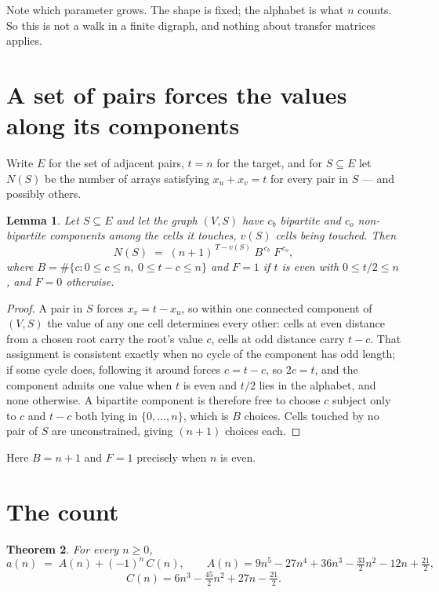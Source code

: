 \documentclass[11pt,a4paper]{article}
\theoremstyle{plain}
\newtheorem{theorem}{Theorem}
\newtheorem{lemma}[theorem]{Lemma}
\theoremstyle{definition}
\begin{document}
Note which parameter grows. The shape is fixed; the alphabet is what $n$ counts. So this is not
a walk in a finite digraph, and nothing about transfer matrices applies.

\section{A set of pairs forces the values along its components}

Write $E$ for the set of adjacent pairs, $t=n$ for the target, and for $S\subseteq E$ let
$N(S)$ be the number of arrays satisfying $x_u+x_v=t$ for every pair in $S$ --- and possibly
others.

\begin{lemma}\label{lem:comp}
Let $S\subseteq E$ and let the graph $(V,S)$ have $c_b$ bipartite and $c_o$ non-bipartite
components among the cells it touches, $v(S)$ cells being touched. Then
\[
N(S)\;=\;(n+1)^{\,T-v(S)}\;B^{\,c_b}\;F^{\,c_o},
\]
where $B=\#\{c: 0\le c\le n,\ 0\le t-c\le n\}$ and $F=1$ if $t$ is even with $0\le t/2\le n$,
and $F=0$ otherwise.
\end{lemma}

\begin{proof}
A pair in $S$ forces $x_v=t-x_u$, so within one connected component of $(V,S)$ the value of any
one cell determines every other: cells at even distance from a chosen root carry the root's
value $c$, cells at odd distance carry $t-c$. That assignment is consistent exactly when no
cycle of the component has odd length; if some cycle does, following it around forces $c=t-c$,
so $2c=t$, and the component admits one value when $t$ is even and $t/2$ lies in the alphabet,
and none otherwise. A bipartite component is therefore free to choose $c$ subject only to
$c$ and $t-c$ both lying in $\{0,\dots,n\}$, which is $B$ choices. Cells touched by no pair
of $S$ are unconstrained, giving $(n+1)$ choices each.
\end{proof}

Here $B=n+1$ and $F=1$ precisely when $n$ is even.

\section{The count}

\begin{theorem}\label{thm:quasi}
For every $n\ge0$,
\[
a(n)\;=\;A(n)+(-1)^n\,C(n),\qquad
A(n)=9n^{5} - 27n^{4} + 36n^{3} - \tfrac{33}{2}n^{2} - 12n + \tfrac{21}{2},
\]
\[
C(n)=6n^{3} - \tfrac{45}{2}n^{2} + 27n - \tfrac{21}{2}.
\]
\end{theorem}
\end{document}
